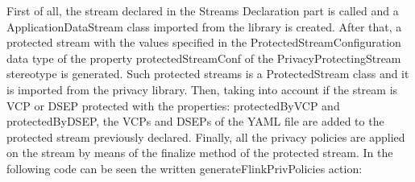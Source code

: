 First of all, the stream declared in the Streams Declaration part is called and a ApplicationDataStream class imported from the library is created. After that, a protected stream with the values specified in the ProtectedStreamConfiguration data type of the property protectedStreamConf of the PrivacyProtectingStream stereotype is generated. Such protected streams is a ProtectedStream class and it is imported from the privacy library. Then, taking into account if the stream is VCP or DSEP protected with the properties: protectedByVCP and protectedByDSEP, the VCPs and DSEPs of the YAML file are added to the protected stream previously declared. Finally, all the privacy policies are applied on the stream by means of the finalize method of the protected stream. In the following code can be seen the written generateFlinkPrivPolicies action:





















